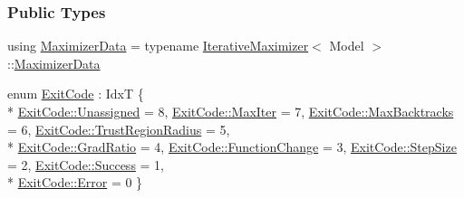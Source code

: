 \subsubsection*{Public Types}
\begin{DoxyCompactItemize}
\item 
using \hyperlink{classmappel_1_1QuasiNewtonMaximizer_a558d3c5e494648dcb756de6a2779402e}{Maximizer\+Data} = typename \hyperlink{classmappel_1_1IterativeMaximizer}{Iterative\+Maximizer}$<$ Model $>$\+::\hyperlink{classmappel_1_1QuasiNewtonMaximizer_a558d3c5e494648dcb756de6a2779402e}{Maximizer\+Data}
\item 
enum \hyperlink{classmappel_1_1Estimator_a6d599915907ba4d0607fcb958d231edc}{Exit\+Code} \+: IdxT \{ \\*
\hyperlink{classmappel_1_1Estimator_a6d599915907ba4d0607fcb958d231edca3476bf9c3af766198bfbd4f065a51e69}{Exit\+Code\+::\+Unassigned} = 8, 
\hyperlink{classmappel_1_1Estimator_a6d599915907ba4d0607fcb958d231edcabbf52264f7a6e91c48a242f95aeed3db}{Exit\+Code\+::\+Max\+Iter} = 7, 
\hyperlink{classmappel_1_1Estimator_a6d599915907ba4d0607fcb958d231edca9e5d3183756d69b44432394db6b6fd86}{Exit\+Code\+::\+Max\+Backtracks} = 6, 
\hyperlink{classmappel_1_1Estimator_a6d599915907ba4d0607fcb958d231edcaadd208e6fbd6ef5ab84a287f259c3b81}{Exit\+Code\+::\+Trust\+Region\+Radius} = 5, 
\\*
\hyperlink{classmappel_1_1Estimator_a6d599915907ba4d0607fcb958d231edca8d0cc41d71102a7952fefe3c63244fd4}{Exit\+Code\+::\+Grad\+Ratio} = 4, 
\hyperlink{classmappel_1_1Estimator_a6d599915907ba4d0607fcb958d231edca8d75b053f108781c02ac7c22facc4338}{Exit\+Code\+::\+Function\+Change} = 3, 
\hyperlink{classmappel_1_1Estimator_a6d599915907ba4d0607fcb958d231edca071449462d0c247e47313eb8c3129dd0}{Exit\+Code\+::\+Step\+Size} = 2, 
\hyperlink{classmappel_1_1Estimator_a6d599915907ba4d0607fcb958d231edca505a83f220c02df2f85c3810cd9ceb38}{Exit\+Code\+::\+Success} = 1, 
\\*
\hyperlink{classmappel_1_1Estimator_a6d599915907ba4d0607fcb958d231edca902b0d55fddef6f8d651fe1035b7d4bd}{Exit\+Code\+::\+Error} = 0
 \}
\end{DoxyCompactItemize}
